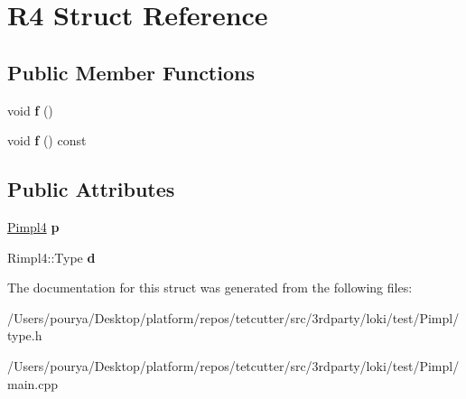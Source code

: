 \hypertarget{structR4}{}\section{R4 Struct Reference}
\label{structR4}
\subsection*{Public Member Functions}
\begin{DoxyCompactItemize}
\item 
\hypertarget{structR4_a72c1655cee0e67866b2539d309020499}{}void {\bfseries f} ()\label{structR4_a72c1655cee0e67866b2539d309020499}

\item 
\hypertarget{structR4_ac91ba504cd7b9460ab7e17ed724ce4db}{}void {\bfseries f} () const \label{structR4_ac91ba504cd7b9460ab7e17ed724ce4db}

\end{DoxyCompactItemize}
\subsection*{Public Attributes}
\begin{DoxyCompactItemize}
\item 
\hypertarget{structR4_a9692d5bb6422efb95571d9d29b5b78b5}{}\hyperlink{classLoki_1_1Pimpl}{Pimpl4} {\bfseries p}\label{structR4_a9692d5bb6422efb95571d9d29b5b78b5}

\item 
\hypertarget{structR4_ab0c447f1c928c74529844b32fbe386eb}{}Rimpl4\+::\+Type {\bfseries d}\label{structR4_ab0c447f1c928c74529844b32fbe386eb}

\end{DoxyCompactItemize}


The documentation for this struct was generated from the following files\+:\begin{DoxyCompactItemize}
\item 
/\+Users/pourya/\+Desktop/platform/repos/tetcutter/src/3rdparty/loki/test/\+Pimpl/type.\+h\item 
/\+Users/pourya/\+Desktop/platform/repos/tetcutter/src/3rdparty/loki/test/\+Pimpl/main.\+cpp\end{DoxyCompactItemize}
